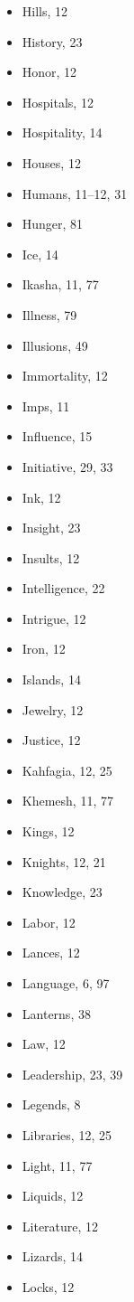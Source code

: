 \begin{multicols}{2}
\begin{itemize}
  \item Hills, 12
  \item History, 23
  \item Honor, 12
  \item Hospitals, 12
  \item Hospitality, 14
  \item Houses, 12
  \item Humans, 11--12, 31
  \item Hunger, 81
  \item Ice, 14
  \item Ikasha, 11, 77
  \item Illness, 79
  \item Illusions, 49
  \item Immortality, 12
  \item Imps, 11
  \item Influence, 15
  \item Initiative, 29, 33
  \item Ink, 12
  \item Insight, 23
  \item Insults, 12
  \item Intelligence, 22
  \item Intrigue, 12
  \item Iron, 12
  \item Islands, 14
  \item Jewelry, 12
  \item Justice, 12
  \item Kahfagia, 12, 25
  \item Khemesh, 11, 77
  \item Kings, 12
  \item Knights, 12, 21
  \item Knowledge, 23
  \item Labor, 12
  \item Lances, 12
  \item Language, 6, 97
  \item Lanterns, 38
  \item Law, 12
  \item Leadership, 23, 39
  \item Legends, 8
  \item Libraries, 12, 25
  \item Light, 11, 77
  \item Liquids, 12
  \item Literature, 12
  \item Lizards, 14
  \item Locks, 12

\end{itemize}
\end{multicols}
